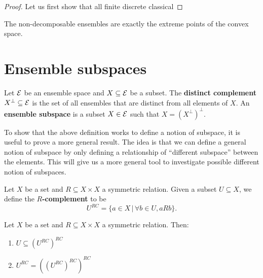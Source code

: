 \begin{proof}
	Let us first show that all finite discrete classical 
\end{proof}

\begin{remark}
	The non-decomposable ensembles are exactly the extreme points of the convex space.
\end{remark}


\section{Ensemble subspaces}

\begin{defn}
	Let $\mathcal{E}$ be an ensemble space and $X \subseteq \mathcal{E}$ be a subset. The \textbf{distinct complement} $X^\perp \subseteq \mathcal{E}$ is the set of all ensembles that are distinct from all elements of $X$. An \textbf{ensemble subspace} is a subset $X \in \mathcal{E}$ such that $X = (X^\perp)^\perp$.
\end{defn}

To show that the above definition works to define a notion of subspace, it is useful to prove a more general result. The idea is that we can define a general notion of subspace by only defining a relationship of ``different subspace'' between the elements. This will give us a more general tool to investigate possible different notion of subspaces.

\begin{defn}
	Let $X$ be a set and $R \subseteq X \times X$ a symmetric relation. Given a subset $U \subseteq X$, we define the \textbf{$R$-complement} to be
	$$ U^{RC} = \{ a \in X \, | \, \forall b \in U, aRb  \}. $$
\end{defn}

\begin{prop}
	Let $X$ be a set and $R \subseteq X \times X$ a symmetric relation. Then:
	\begin{enumerate}
		\item $U \subseteq (U^{RC})^{RC}$
		\item $U^{RC} = ((U^{RC})^{RC})^{RC}$
	\end{enumerate}
\end{prop}

